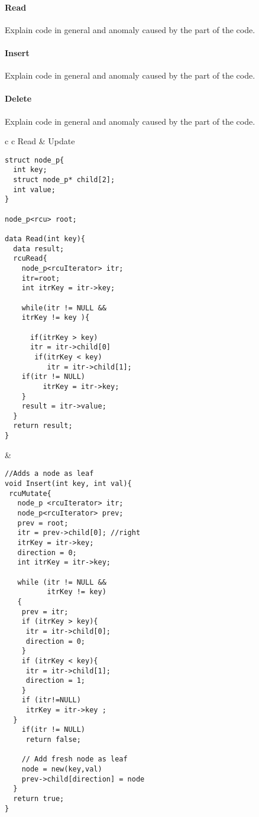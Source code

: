 \paragraph{Read}Explain code in general and anomaly caused by the part of the code.

\paragraph{Insert} Explain code in general and anomaly caused by the part of the code.

\paragraph{Delete} Explain code in general and anomaly caused by the part of  the code.


\begin{table}[]
	\begin{tabular}{ c c }
		Read & Update \\		
\begin{lstlisting}
struct node_p{
  int key;
  struct node_p* child[2];
  int value;
}

node_p<rcu> root;
	
data Read(int key){
  data result;	
  rcuRead{
    node_p<rcuIterator> itr; 
    itr=root;
    int itrKey = itr->key; 
        
    while(itr != NULL && 
	itrKey != key ){

      if(itrKey > key)
	  itr = itr->child[0]
       if(itrKey < key)
          itr = itr->child[1];
	if(itr != NULL) 
         itrKey = itr->key;
    }
    result = itr->value;
  }
  return result;
}
\end{lstlisting} &		
\begin{lstlisting}
//Adds a node as leaf
void Insert(int key, int val){
 rcuMutate{
   node_p <rcuIterator> itr;
   node_p<rcuIterator> prev;
   prev = root;
   itr = prev->child[0]; //right
   itrKey = itr->key;
   direction = 0;
   int itrKey = itr->key;

   while (itr != NULL && 
          itrKey != key)
   {
    prev = itr;
    if (itrKey > key){
     itr = itr->child[0];
     direction = 0;
    }
    if (itrKey < key){
     itr = itr->child[1];
     direction = 1;
    }
    if (itr!=NULL) 
     itrKey = itr->key ;
  }
    if(itr != NULL)
     return false;

    // Add fresh node as leaf  
    node = new(key,val)
    prev->child[direction] = node
  }
  return true;
}
		\end{lstlisting} 
	\end{tabular}
	
\caption{RCU-Red-Black Tree Implementation.}
\label{tab:rcurbtree}
\end{table}

